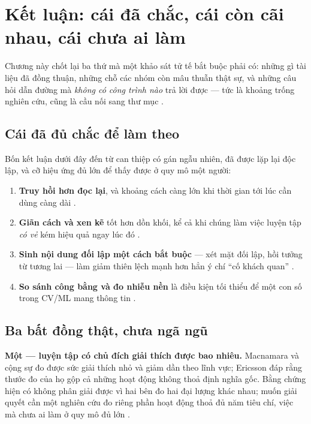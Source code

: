 \documentclass[hieu-suat.tex]{subfiles}
\begin{document}
\chapter{Kết luận: cái đã chắc, cái còn cãi nhau, cái chưa ai làm}

\begin{tomtat}
Chương này chốt lại ba thứ mà một khảo sát tử tế bắt buộc phải có: những gì tài liệu đã đồng thuận, những chỗ các nhóm còn mâu thuẫn thật sự, và những câu hỏi dẫn đường mà \emph{không có công trình nào} trả lời được --- tức là khoảng trống nghiên cứu, cũng là cầu nối sang thư mục .
\end{tomtat}

\section{Cái đã đủ chắc để làm theo}

Bốn kết luận dưới đây đến từ can thiệp có gán ngẫu nhiên, đã được lặp lại độc lập, và cỡ hiệu ứng đủ lớn để thấy được ở quy mô một người:

\begin{enumerate}
\item \textbf{Truy hồi hơn đọc lại}, và khoảng cách càng lớn khi thời gian tới lúc cần dùng càng dài \cite{roediger2006,karpicke2008,dunlosky2013}.
\item \textbf{Giãn cách và xen kẽ} tốt hơn dồn khối, kể cả khi chúng làm việc luyện tập \emph{có vẻ} kém hiệu quả ngay lúc đó \cite{cepeda2006,rohrer2015}.
\item \textbf{Sinh nội dung đối lập một cách bắt buộc} --- xét mặt đối lập, hồi tưởng từ tương lai --- làm giảm thiên lệch mạnh hơn hẳn ý chí ``cố khách quan'' \cite{lord1984,mitchell1989}.
\item \textbf{So sánh công bằng và đo nhiễu nền} là điều kiện tối thiểu để một con số trong CV/ML mang thông tin \cite{musgrave2020,melis2018,bouthillier2021}.
\end{enumerate}

\section{Ba bất đồng thật, chưa ngã ngũ}

\textbf{Một --- luyện tập có chủ đích giải thích được bao nhiêu.} Macnamara và cộng sự \cite{macnamara2014} đo được sức giải thích nhỏ và giảm dần theo lĩnh vực; Ericsson \cite{ericsson2021} đáp rằng thước đo của họ gộp cả những hoạt động không thoả định nghĩa gốc. Bằng chứng hiện có không phân giải được vì hai bên đo hai đại lượng khác nhau; muốn giải quyết cần một nghiên cứu đo riêng phần hoạt động thoả đủ năm tiêu chí, việc mà chưa ai làm ở quy mô đủ lớn \nM{}.
\end{document}
